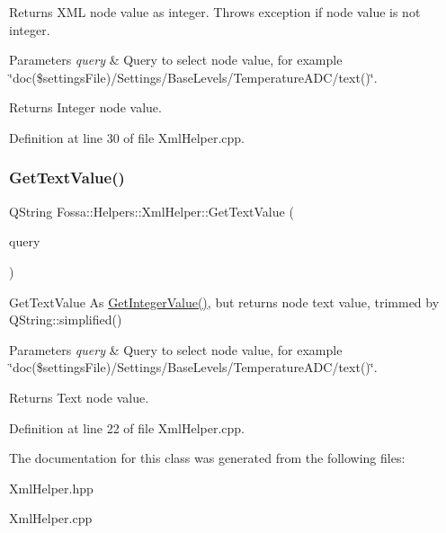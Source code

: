 Returns X\+ML node value as integer. Throws exception if node value is not integer. 


\begin{DoxyParams}{Parameters}
{\em query} & Query to select node value, for example \char`\"{}doc(\$settings\+File)/\+Settings/\+Base\+Levels/\+Temperature\+A\+D\+C/text()\char`\"{}. \\
\hline
\end{DoxyParams}
\begin{DoxyReturn}{Returns}
Integer node value. 
\end{DoxyReturn}


Definition at line 30 of file Xml\+Helper.\+cpp.

\mbox{\label{class_fossa_1_1_helpers_1_1_xml_helper_a2e63bbe1bd57f655ee865171b7a24c4a}} 
\subsubsection{\texorpdfstring{Get\+Text\+Value()}{GetTextValue()}}
{\footnotesize\ttfamily Q\+String Fossa\+::\+Helpers\+::\+Xml\+Helper\+::\+Get\+Text\+Value (\begin{DoxyParamCaption}\item[{const Q\+Xml\+Query $\ast$}]{query }\end{DoxyParamCaption})\hspace{0.3cm}{\ttfamily [static]}}



Get\+Text\+Value As \hyperlink{class_fossa_1_1_helpers_1_1_xml_helper_a7bc8a5dd4d5ab503f274c3bb9a559f84}{Get\+Integer\+Value()}, but returns node text value, trimmed by Q\+String\+::simplified() 


\begin{DoxyParams}{Parameters}
{\em query} & Query to select node value, for example \char`\"{}doc(\$settings\+File)/\+Settings/\+Base\+Levels/\+Temperature\+A\+D\+C/text()\char`\"{}. \\
\hline
\end{DoxyParams}
\begin{DoxyReturn}{Returns}
Text node value. 
\end{DoxyReturn}


Definition at line 22 of file Xml\+Helper.\+cpp.



The documentation for this class was generated from the following files\+:\begin{DoxyCompactItemize}
\item 
Xml\+Helper.\+hpp\item 
Xml\+Helper.\+cpp\end{DoxyCompactItemize}
